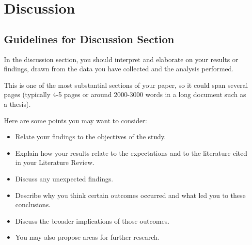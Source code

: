 \chapter{Discussion}

\section*{Guidelines for Discussion Section}
In the discussion section, you should interpret and elaborate on your results or findings, drawn from the data you have collected and the analysis performed. 

This is one of the most substantial sections of your paper, so it could span several pages (typically 4-5 pages or around 2000-3000 words in a long document such as a thesis). 

Here are some points you may want to consider:
\begin{itemize}
    \item Relate your findings to the objectives of the study.
    \item Explain how your results relate to the expectations and to the literature cited in your Literature Review.
    \item Discuss any unexpected findings.
    \item Describe why you think certain outcomes occurred and what led you to these conclusions.
    \item Discuss the broader implications of those outcomes.
    \item You may also propose areas for further research.
\end{itemize}

